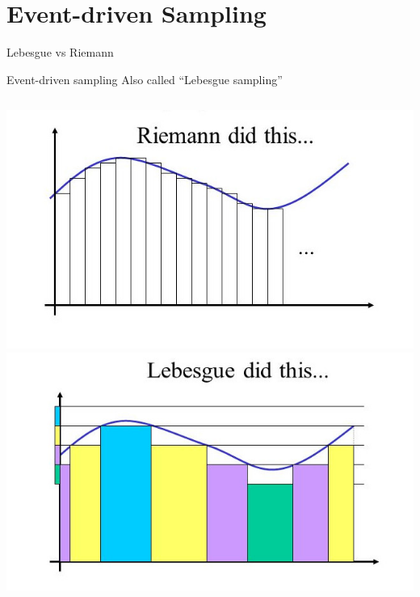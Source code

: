 \documentclass[11pt,center]{beamer}
\begin{document}
\section{Event-driven Sampling}
	\begin{frame}{Lebesgue vs Riemann}
		\begin{block}{Event-driven sampling}
			Also called ``Lebesgue sampling''
		\end{block}
		\vfill
		\begin{columns}
			\includegraphics[width=\textwidth]{../pics/riemann_int_crop.jpg}
			\pause
			\includegraphics[width=\textwidth]{../pics/lebesgue_int_crop.jpg}
		\end{columns}
	\end{frame}
\end{document}
